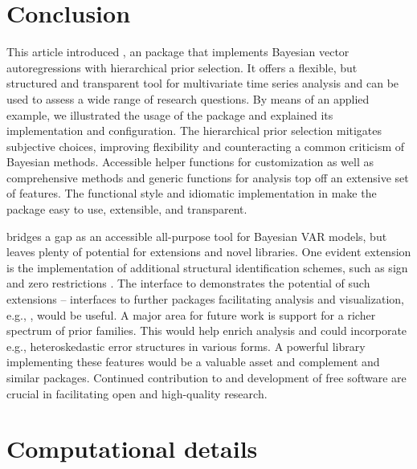 \documentclass[article,nojss]{jss} %
\begin{document}
\clearpage

\section{Conclusion} \label{sec:concl}

This article introduced , an  package that implements Bayesian vector autoregressions with hierarchical prior selection. It offers a flexible, but structured and transparent tool for multivariate time series analysis and can be used to assess a wide range of research questions. By means of an applied example, we illustrated the usage of the package and explained its implementation and configuration.
The hierarchical prior selection mitigates subjective choices, improving flexibility and counteracting a common criticism of Bayesian methods.
Accessible helper functions for customization as well as comprehensive methods and generic functions for analysis top off an extensive set of features. The functional style and idiomatic implementation in  make the package easy to use, extensible, and transparent.

 bridges a gap as an accessible all-purpose tool for Bayesian VAR models, but leaves plenty of potential for extensions and novel libraries.
One evident extension is the implementation of additional structural identification schemes, such as sign and zero restrictions \citep{arias2018}.
The interface to  demonstrates the potential of such extensions -- interfaces to further packages facilitating analysis and visualization, e.g.,  \citep{kay2020}, would be useful.
A major area for future work is support for a richer spectrum of prior families. This would help enrich analysis and could incorporate e.g., heteroskedastic error structures in various forms. A powerful library implementing these features would be a valuable asset and complement  and similar  packages.
Continued contribution to and development of free software are crucial in facilitating open and high-quality research.




\section*{Computational details}
\end{document}
